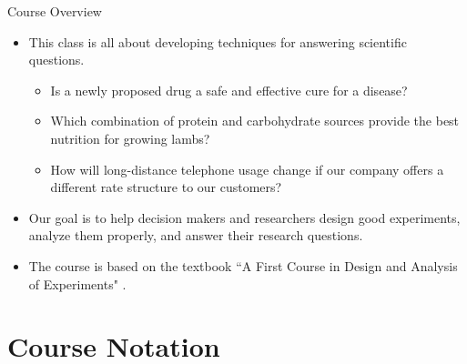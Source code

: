 \begin{frame}[allowframebreaks]{Course Overview}
  \begin{itemize}
    \item This class is all about developing techniques for answering scientific questions.
    \begin{itemize}
      \item Is a newly proposed drug a safe and effective cure for a disease?
      \item Which combination of protein and carbohydrate sources provide the best nutrition for growing lambs?
      \item How will long-distance telephone usage change if our company offers a different rate structure to our customers?
    \end{itemize}
    \item Our goal is to help decision makers and researchers design good experiments, analyze them properly, and answer their research questions.
    \item The course is based on the textbook ``A First Course in Design and Analysis of Experiments" \citep{oehlert2000}.
  \end{itemize}
\end{frame}

\section{Course Notation}

